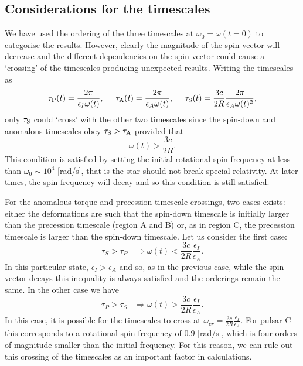 \documentclass[../full_thesis/full_thesis.tex]{subfiles}
\begin{document}
\begin{subappendices}
\section{Considerations for the timescales}\label{sec: timescales}
We have used the ordering of the three timescales at $\omega_{0}=\omega(t=0)$
to categorise the results. However, clearly the magnitude of the spin-vector
will decrease and the different dependencies on the spin-vector could cause a
`crossing' of the timescales producing unexpected results. Writing the
timescales as
\begin{equation}
\tau_{\mathrm{P}}(t)=\frac{2\pi}{\epsilon_{I}\omega(t)}, \;\;\;\;\;
\tau_{\mathrm{A}}(t)=\frac{2\pi}{\epsilon_{A}\omega(t)},  \;\;\;\;\;
\tau_{\mathrm{S}}(t)=\frac{3c}{2R}\frac{2\pi}{\epsilon_{A}\omega(t)^{2}},
\end{equation}
only $\tau_{\mathrm{S}}$ could `cross' with the other two timescales since the spin-down
and anomalous timescales obey $\tau_{\mathrm{S}}>\tau_{\mathrm{A}}$ provided that
\begin{equation*}
\omega(t)>\frac{3c}{2R}.
\end{equation*}
This condition is satisfied by setting the initial rotational spin frequency at
less than $\omega_{0} \sim 10^{4}$ [rad/s], that is the star should not break
special relativity. At later times, the spin frequency will decay and so this
condition is still satisfied.

For the anomalous torque and precession timescale crossings, two cases exists:
either the deformations are such that the spin-down timescale is initially larger than
the precession timescale (region A and B) or, as in region C, the precession
timescale is larger than the spin-down timescale. Let us consider the first case:
\begin{equation}
\tau_{S}>\tau_{P} \;\;\;
\Rightarrow \omega(t)<\frac{3c}{2R}\frac{\epsilon_{I}}{\epsilon_{A}}.
\end{equation}
In this particular state, $\epsilon_{I}>\epsilon_{A}$ and so, as in the previous
case, while the spin-vector decays this inequality is always satisfied and the
orderings remain the same. In the other case we have
\begin{equation}
\tau_{P}>\tau_{S} \;\;\;
\Rightarrow \omega(t)>\frac{3c}{2R}\frac{\epsilon_{I}}{\epsilon_{A}}.
\end{equation}
In this case, it is possible for the timescales to cross at
$\omega_{cr}=\frac{3c}{2R}\frac{\epsilon_{I}}{\epsilon_{A}}$. For pulsar C this
corresponds to a rotational spin frequency of $0.9$ [rad/s], which is four
orders of magnitude smaller than the initial frequency. For this reason, we can
rule out this crossing of the timescales as an important factor in
calculations.


\end{subappendices}

\biblio
\end{document}
